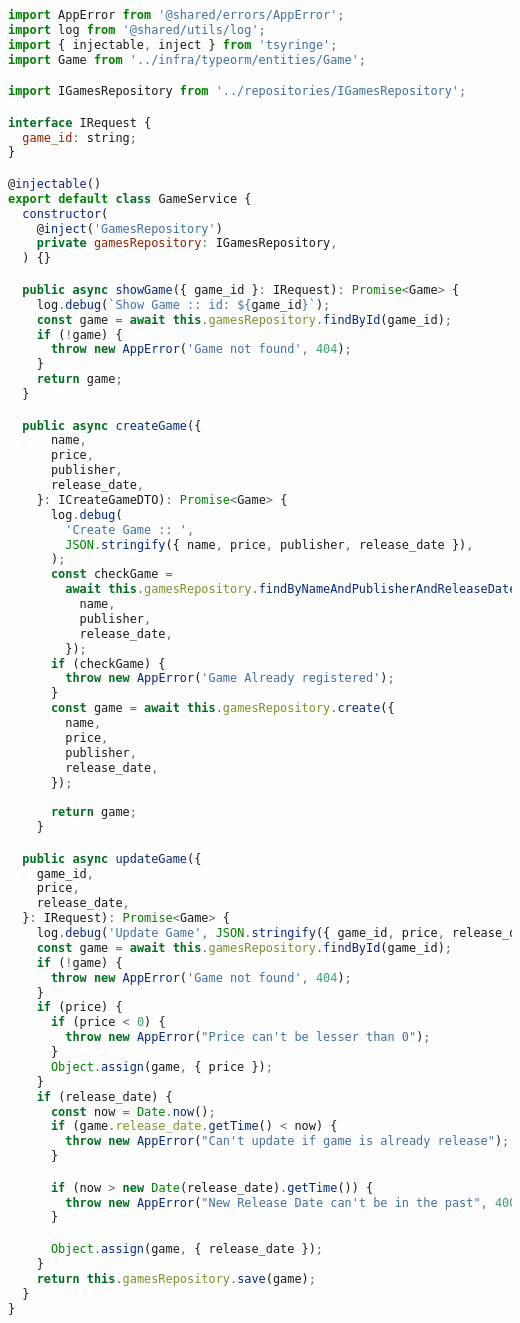 \begin{lstlisting}[language=JavaScript, caption={Implementação que viola o SRP},captionpos=b, label=alg:gameservice]
import AppError from '@shared/errors/AppError';
import log from '@shared/utils/log';
import { injectable, inject } from 'tsyringe';
import Game from '../infra/typeorm/entities/Game';

import IGamesRepository from '../repositories/IGamesRepository';

interface IRequest {
  game_id: string;
}

@injectable()
export default class GameService {
  constructor(
    @inject('GamesRepository')
    private gamesRepository: IGamesRepository,
  ) {}

  public async showGame({ game_id }: IRequest): Promise<Game> {
    log.debug(`Show Game :: id: ${game_id}`);
    const game = await this.gamesRepository.findById(game_id);
    if (!game) {
      throw new AppError('Game not found', 404);
    }
    return game;
  }

  public async createGame({
      name,
      price,
      publisher,
      release_date,
    }: ICreateGameDTO): Promise<Game> {
      log.debug(
        'Create Game :: ',
        JSON.stringify({ name, price, publisher, release_date }),
      );
      const checkGame =
        await this.gamesRepository.findByNameAndPublisherAndReleaseDate({
          name,
          publisher,
          release_date,
        });
      if (checkGame) {
        throw new AppError('Game Already registered');
      }
      const game = await this.gamesRepository.create({
        name,
        price,
        publisher,
        release_date,
      });
  
      return game;
    }

  public async updateGame({
    game_id,
    price,
    release_date,
  }: IRequest): Promise<Game> {
    log.debug('Update Game', JSON.stringify({ game_id, price, release_date }));
    const game = await this.gamesRepository.findById(game_id);
    if (!game) {
      throw new AppError('Game not found', 404);
    }
    if (price) {
      if (price < 0) {
        throw new AppError("Price can't be lesser than 0");
      }
      Object.assign(game, { price });
    }
    if (release_date) {
      const now = Date.now();
      if (game.release_date.getTime() < now) {
        throw new AppError("Can't update if game is already release");
      }

      if (now > new Date(release_date).getTime()) {
        throw new AppError("New Release Date can't be in the past", 400);
      }

      Object.assign(game, { release_date });
    }
    return this.gamesRepository.save(game);
  }
}
\end{lstlisting}